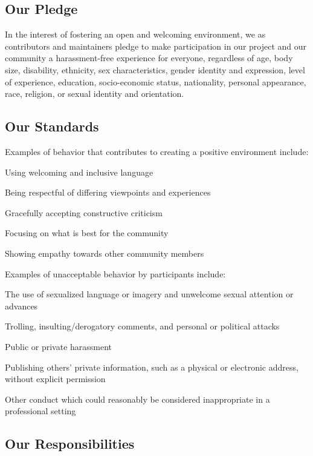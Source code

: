 \subsection*{Our Pledge}

In the interest of fostering an open and welcoming environment, we as contributors and maintainers pledge to make participation in our project and our community a harassment-\/free experience for everyone, regardless of age, body size, disability, ethnicity, sex characteristics, gender identity and expression, level of experience, education, socio-\/economic status, nationality, personal appearance, race, religion, or sexual identity and orientation.

\subsection*{Our Standards}

Examples of behavior that contributes to creating a positive environment include\-:


\begin{DoxyItemize}
\item Using welcoming and inclusive language
\item Being respectful of differing viewpoints and experiences
\item Gracefully accepting constructive criticism
\item Focusing on what is best for the community
\item Showing empathy towards other community members
\end{DoxyItemize}

Examples of unacceptable behavior by participants include\-:


\begin{DoxyItemize}
\item The use of sexualized language or imagery and unwelcome sexual attention or advances
\item Trolling, insulting/derogatory comments, and personal or political attacks
\item Public or private harassment
\item Publishing others' private information, such as a physical or electronic address, without explicit permission
\item Other conduct which could reasonably be considered inappropriate in a professional setting
\end{DoxyItemize}

\subsection*{Our Responsibilities}

